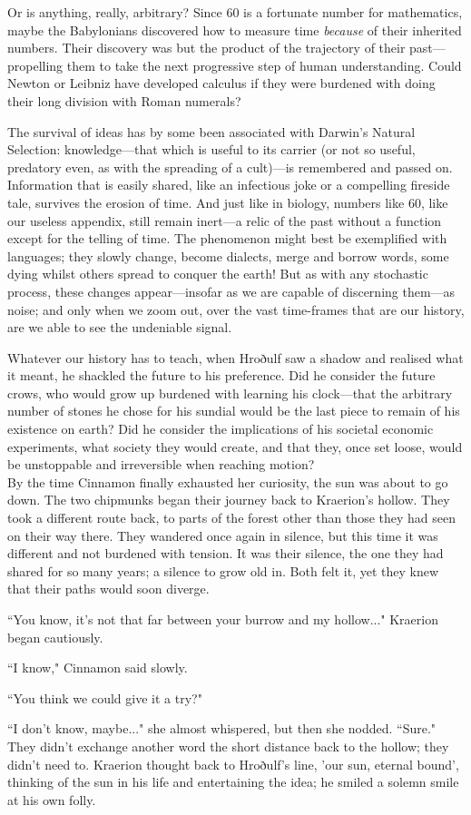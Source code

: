 Or is anything, really, arbitrary?
Since 60 is a fortunate number for mathematics, maybe the Babylonians discovered how to measure time \textit{because} of their inherited numbers.
Their discovery was but the product of the trajectory of their past---propelling them to take the next progressive step of human understanding.
Could Newton or Leibniz have developed calculus if they were burdened with doing their long division with Roman numerals?

\renewcommand*{\thepage}{\footnotesize \arabic{page}}

The survival of ideas has by some been associated with Darwin's Natural Selection: knowledge---that which is useful to its carrier (or not so useful, predatory even, as with the spreading of a cult)---is remembered and passed on.
Information that is easily shared, like an infectious joke or a compelling fireside tale, survives the erosion of time.
And just like in biology, numbers like 60, like our useless appendix, still remain inert---a relic of the past without a function except for the telling of time.
The phenomenon might best be exemplified with languages; they slowly change, become dialects, merge and borrow words, some dying whilst others spread to conquer the earth!
But as with any stochastic process, these changes appear---insofar as we are capable of discerning them---as noise; and only when we zoom out, over the vast time-frames that are our history, are we able to see the undeniable signal.

Whatever our history has to teach, when Hroðulf saw a shadow and realised what it meant, he shackled the future to his preference.
Did he consider the future crows, who would grow up burdened with learning his clock---that the arbitrary number of stones he chose for his sundial would be the last piece to remain of his existence on earth?
Did he consider the implications of his societal economic experiments, what society they would create, and that they, once set loose, would be unstoppable and irreversible when reaching motion?\\

By the time Cinnamon finally exhausted her curiosity, the sun was about to go down.
The two chipmunks began their journey back to Kraerion's hollow.
They took a different route back, to parts of the forest other than those they had seen on their way there.
They wandered once again in silence, but this time it was different and not burdened with tension.
It was their silence, the one they had shared for so many years; a silence to grow old in.
Both felt it, yet they knew that their paths would soon diverge.

``You know, it's not that far between your burrow and my hollow..." Kraerion began cautiously.

``I know," Cinnamon said slowly.

``You think we could give it a try?"

``I don't know, maybe..." she almost whispered, but then she nodded.
``Sure."
They didn't exchange another word the short distance back to the hollow; they didn't need to.
Kraerion thought back to Hroðulf's line, 'our sun, eternal bound', thinking of the sun in his life and entertaining the idea; he smiled a solemn smile at his own folly.
